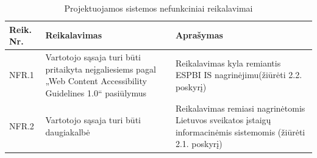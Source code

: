\begin{table}[!ht]
    \centering
    \renewcommand{\arraystretch}{1.2}
    \renewcommand\thetable{6}
    \begin{tabular}{|m{3em}|m{17em}|m{17em}|}
    \hline 
    \rowcolor[HTML]{EFEFEF} 
    Reik. Nr. & Reikalavimas & Aprašymas \\ \hline

    NFR.1  &  Vartotojo sąsaja turi būti pritaikyta neįgaliesiems pagal „Web Content Accessibility Guidelines 1.0“ pasiūlymus  &  Reikalavimas kyla remiantis ESPBI IS nagrinėjimu(žiūrėti 2.2. poskyrį)       \\ \hline
    NFR.2  &  Vartotojo sąsaja turi būti daugiakalbė &  Reikalavimas remiasi nagrinėtomis Lietuvos sveikatos įstaigų informacinėmis sistemomis (žiūrėti 2.1. poskyrį)       \\ \hline


    \end{tabular}
    \caption{Projektuojamos sistemos nefunkciniai reikalavimai} 

\end{table}

